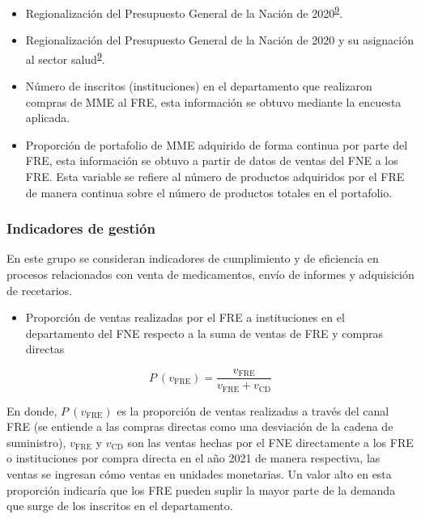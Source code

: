 \documentclass[
  oneside]{book}
\providecommand{\tightlist}{%
  \setlength{\itemsep}{0pt}\setlength{\parskip}{0pt}}
\begin{document}
\begin{itemize}
\item
  Regionalización del Presupuesto General de la Nación de 2020\textsuperscript{\protect\hyperlink{ref-DepartamentoNacionaldePlaneacion2019}{9}}.
\item
  Regionalización del Presupuesto General de la Nación de 2020 y su asignación al sector salud\textsuperscript{\protect\hyperlink{ref-DepartamentoNacionaldePlaneacion2019}{9}}.
\item
  Número de inscritos (instituciones) en el departamento que realizaron compras de MME al FRE, esta información se obtuvo mediante la encuesta aplicada.
\item
  Proporción de portafolio de MME adquirido de forma continua por parte del FRE, esta información se obtuvo a partir de datos de ventas del FNE a los FRE. Esta variable se refiere al número de productos adquiridos por el FRE de manera continua sobre el número de productos totales en el portafolio.
\end{itemize}

\hypertarget{indicadores-de-gestiuxf3n}{%
\subsubsection{Indicadores de gestión}\label{indicadores-de-gestiuxf3n}}

En este grupo se consideran indicadores de cumplimiento y de eficiencia en procesos relacionados con venta de medicamentos, envío de informes y adquisición de recetarios.

\begin{itemize}
\tightlist
\item
  Proporción de ventas realizadas por el FRE a instituciones en el departamento del FNE respecto a la suma de ventas de FRE y compras directas
\end{itemize}

\[P~\left(v_{\mathrm{FRE}}\right) = \frac{v_{\mathrm{FRE}} }{v_{\mathrm{FRE}} + v_{\mathrm{CD}}}\]

En donde, \(P~\left(v_{\mathrm{FRE}}\right)\) es la proporción de ventas realizadas a través del canal FRE (se entiende a las compras directas como una desviación de la cadena de suministro), \(v_{\mathrm{FRE}}\) y \(v_{\mathrm{CD}}\) son las ventas hechas por el FNE directamente a los FRE o instituciones por compra directa en el año 2021 de manera respectiva, las ventas se ingresan cómo ventas en unidades monetarias. Un valor alto en esta proporción indicaría que los FRE pueden suplir la mayor parte de la demanda que surge de los inscritos en el departamento.
\end{document}
